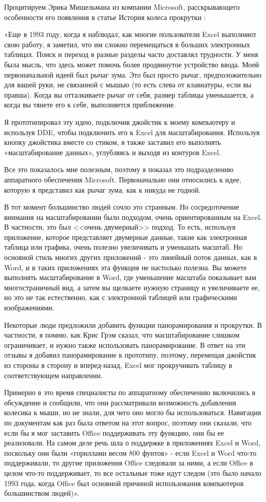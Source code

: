 \documentclass[11pt, a4paper]{article}
\begin{document}
Процитируем Эрика Мишельмана из компании Microsoft, расскрывающего особенности его появления в статье История колеса прокрутки \cite{ink}:

«Еще в 1993 году, когда я наблюдал, как многие пользователи Excel выполняют свою работу, я заметил, что им сложно перемещаться в больших электронных таблицах. Поиск и переход в разные разделы часто доставлял трудности. У меня была мысль, что здесь может помочь более продвинутое устройство ввода.
Моей первоначальной идеей был рычаг зума. Это был просто рычаг, предположительно для вашей руки, не связанной с мышью (то есть слева от клавиатуры, если вы правша). Когда вы отталкиваете рычаг от себя, размер таблицы уменьшается, а когда вы тянете его к себе, выполняется приближение.

Я прототипировал эту идею, подключив джойстик к моему компьютеру и используя DDE, чтобы подключить его к Excel для масштабирования. Используя кнопку джойстика вместе со стиком, я также заставил его выполнять «масштабирование данных», углубляясь и выходя из контуров Excel.

Все это показалось мне полезным, поэтому я показал это подразделению аппаратного обеспечения Microsoft. Первоначально они относились к идее, которую я представил как рычаг зума, как к никуда не годной.

В тот момент большинство людей сочло это странным. Но сосредоточение внимания на масштабировании было подходом, очень ориентированным на Excel. В частности, это был <<очень двумерный>> подход. То есть, используя приложение, которое представляет двумерные данные, такие как электронная таблица или графика, очень полезно увеличивать и уменьшать масштаб. Но основной стиль многих других приложений - это линейный поток данных, как в Word, и в таких приложениях эта функция не настолько полезна. Вы можете выполнять масштабирование в Word, где уменьшение масштаба показывает вам многостраничный вид, а затем вы щелкаете нужную страницу и увеличиваете ее, но это не так естественно, как с электронной таблицей или графическими изображениями.

Некоторые люди предложили добавить функции панорамирования и прокрутки. В частности, я помню, как Крис Грэм сказал, что масштабирование слишком ограничивает, и нужно также использовать панорамирование. В ответ на эти отзывы я добавил панорамирование к прототипу, поэтому, перемещая джойстик из стороны в сторону и вперед-назад, Excel мог прокручивать таблицу в соответствующем направлении.

Примерно в это время специалисты по аппаратному обеспечению включились в обсуждение и сообщили, что они рассматривали возможность добавления колесика к мыши, но не знали, для чего оно могло бы использоваться. Навигация по документам как раз была ответом на этот вопрос, поэтому они сказали, что если бы я мог заставить Office поддерживать эту функцию, они бы ее реализовали. На самом деле речь шла о поддержке в приложениях Excel и Word, поскольку они были «гориллами весом 800 фунтов» - если Excel и Word что-то поддерживали, то другие приложения Office следовали за ними, а если Office в целом что-то поддерживает, то все остальные тоже идут следом (это было начало 1993 года, когда Office был основной причиной использования компьютеров большинством людей)».
\end{document}
